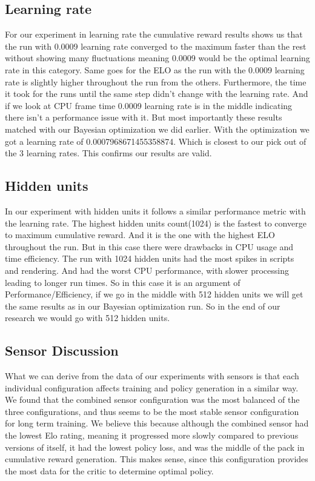 \documentclass{LSkill}
\begin{document}
\subsection{Learning rate}
For our experiment in learning rate the cumulative reward results shows us that the run with 0.0009 learning rate converged to the maximum faster than the rest without showing many fluctuations meaning 0.0009 would be the optimal learning rate in this category. Same goes for the ELO as the run with the 0.0009 learning rate is slightly higher throughout the run from the others. Furthermore, the time it took for the runs until the same step didn’t change with the learning rate. And if we look at CPU frame time 0.0009 learning rate is in the middle indicating there isn’t a performance issue with it. But most importantly these results matched with our  Bayesian optimization we did earlier. With the optimization we got a learning rate of  0.0007968671455358874. Which is closest to our pick out of the 3 learning rates. This confirms our results are valid.
\subsection{Hidden units}
In our experiment with hidden units it follows a similar performance metric with the learning rate. The highest hidden units count(1024) is the fastest to converge to maximum cumulative reward. And it is the one with the highest ELO throughout the run. But in this case there were drawbacks in CPU usage and time efficiency. The run with 1024 hidden units had the most spikes in scripts and rendering. And had the worst CPU performance, with slower processing leading to longer run times. So in this case it is an argument of Performance/Efficiency, if we go in the middle with 512 hidden units we will get the same results as in our Bayesian optimization run. So in the end of our research we would go with 512 hidden units.
\subsection{Sensor Discussion}
What we can derive from the data of our experiments with sensors is that each individual configuration affects training and policy generation in a similar way. We found that the combined sensor configuration was the most balanced of the three configurations, and thus seems to be the most stable sensor configuration for long term training. We believe this because although the combined sensor had the lowest Elo rating, meaning it progressed more slowly compared to previous versions of itself, it had the lowest policy loss, and was the middle of the pack in cumulative reward generation. This makes sense, since this configuration provides the most data for the critic to determine optimal policy. 
\end{document}
